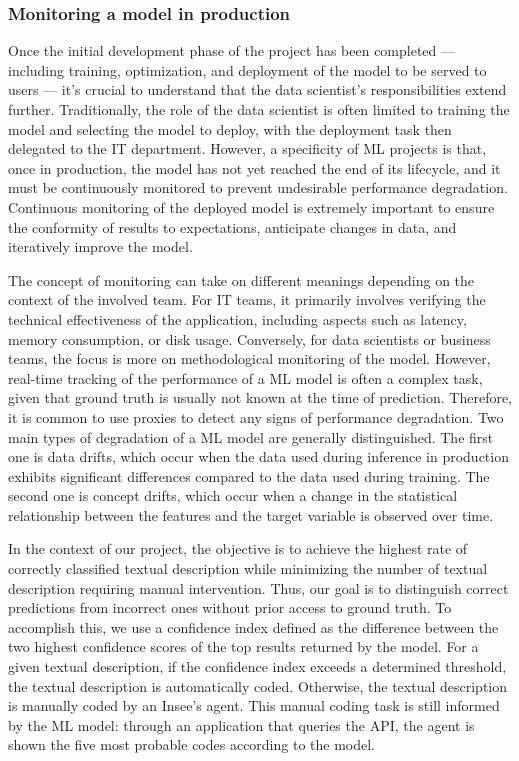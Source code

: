 \subsubsection{Monitoring a model in production}
\label{subsubsec:monitoring}

Once the initial development phase of the project has been completed — including training, optimization, and deployment of the model to be served to users — it's crucial to understand that the data scientist's responsibilities extend further. Traditionally, the role of the data scientist is often limited to training the model and selecting the model to deploy, with the deployment task then delegated to the IT department. However, a specificity of ML projects is that, once in production, the model has not yet reached the end of its lifecycle, and it must be continuously monitored to prevent undesirable performance degradation. Continuous monitoring of the deployed model is extremely important to ensure the conformity of results to expectations, anticipate changes in data, and iteratively improve the model.

The concept of monitoring can take on different meanings depending on the context of the involved team. For IT teams, it primarily involves verifying the technical effectiveness of the application, including aspects such as latency, memory consumption, or disk usage. Conversely, for data scientists or business teams, the focus is more on methodological monitoring of the model. However, real-time tracking of the performance of a ML model is often a complex task, given that ground truth is usually not known at the time of prediction. Therefore, it is common to use proxies to detect any signs of performance degradation. Two main types of degradation of a ML model are generally distinguished. The first one is data drifts, which occur when the data used during inference in production exhibits significant differences compared to the data used during training. The second one is concept drifts, which occur when a change in the statistical relationship between the features and the target variable is observed over time.

In the context of our project, the objective is to achieve the highest rate of correctly classified textual description while minimizing the number of textual description requiring manual intervention. Thus, our goal is to distinguish correct predictions from incorrect ones without prior access to ground truth. To accomplish this, we use a confidence index defined as the difference between the two highest confidence scores of the top results returned by the model. For a given textual description, if the confidence index exceeds a determined threshold, the textual description is automatically coded. Otherwise, the textual description is manually coded by an Insee's agent. This manual coding task is still informed by the ML model: through an application that queries the API, the agent is shown the five most probable codes according to the model. 

